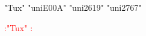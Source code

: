 \documentclass{article}
\def\charGlyphname#1{\XeTeXglyph\XeTeXglyphindex "#1" }
\begin{document}
\charGlyphname{Tux}
\charGlyphname{uniE00A}
\charGlyphname{uni2619}
\charGlyphname{uni2767}

\textcolor{red}{:\charGlyphname{Tux}:}
\end{document}
